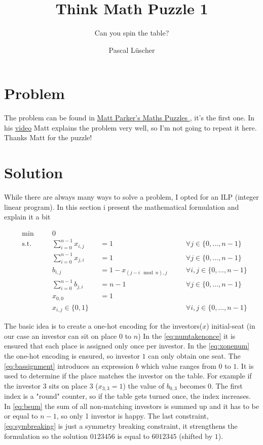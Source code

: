 \documentclass[parskip=half]{scrartcl}
\title{Think Math Puzzle 1}
\subtitle{Can you spin the table?}
\author{Pascal Lüscher}
\newcommand{\zeroton}{\{0,\ldots,n-1\}}
\begin{document}
	
	\maketitle
		
	\section{Problem}
	The problem can be found in \href{https://www.think-maths.co.uk/maths-puzzles}{ Matt Parker's Maths Puzzles
}, it's the first one. In his \href{https://www.youtube.com/watch?v=T29dydI97zY}{video} Matt explains the problem very well, so I'm not going to repeat it here. Thanks Matt for the puzzle!
		
	
	\section{Solution}
	While there are always many ways to solve a problem, I opted for an ILP (integer linear program). 
	In this section i present the mathematical formulation and explain it a bit

	\begin{align}
		&\min \quad &&0 \\
		& \text{s.t.} \quad 
		&& \sum_{i=0}^{n-1}x_{i,j}		&&= 1 			&&\quad \forall j \in \zeroton \label{eq:numtakenonce} \\		
		& && \sum_{i=0}^{n-1}x_{j,i}		&&= 1	 		&&\quad \forall j \in \zeroton \label{eq:xonenum} \\
		& && b_{i,j}  					&&= 1 - x_{(j - i \mod n),j}	&&\quad \forall i,j \in \zeroton \label{eq:bassignment} \\
		& && \sum_{i=0}^{n-1}b_{j,i}		&&= n-1 		&&\quad \forall j \in \zeroton \label{eq:bsum} \\
		& && x_{0,0}					&&= 1			&& \label{eq:symbreaking}\\
		& && x_{i,j} \in \{0,1\} 		&& 				&&\quad \forall i,j \in \zeroton \label{eq:binary}
	\end{align}
	
	The basic idea is to create a one-hot encoding for the investors($x$) initial-seat (in our case an investor can sit on place $0$ to $n$)
	In the \autoref{eq:numtakenonce} it is ensured that each place is assigned only once per investor. In the \autoref{eq:xonenum} the one-hot encoding is ensured, so investor $1$ can only obtain one seat. 
	The \autoref{eq:bassignment} introduces an expression $b$ which value ranges from $0$ to $1$. It is used to determine if the place matches the investor on the table. For example if the investor 3 sits on place 3 ($x_{3,3} = 1$) the value of $b_{0,3}$ becomes $0$. The first index is a "round" counter, so if the table gets turned once, the index increases. In \autoref{eq:bsum} the sum of all non-matching investors is summed up and it has to be or equal to $n-1$, so only 1 investor is happy.
	The last constraint, \autoref{eq:symbreaking} is just a symmetry breaking constraint, it strengthens the formulation so the solution $0123456$ is equal to $6012345$ (shifted by $1$).
	
\end{document}
